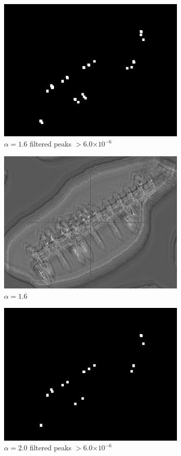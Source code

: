 \documentclass[12pt]{article}
\providecommand{\e}[1]{\ensuremath{\times 10^{#1}}}
\begin{document}
\begin{figure}
\centering
\includegraphics[width=0.80\textwidth]{v2/boats_a16_peak.png}
\caption{\(\alpha=1.6\) filtered peaks \(> 6.0\e{-6}\)}
\label{a16peak}
\end{figure}

\begin{figure}
\centering
\includegraphics[width=0.80\textwidth]{v2/boats_a16.png}
\caption{\(\alpha=1.6\)}
\label{a16}
\end{figure}

\begin{figure}
\centering
\includegraphics[width=0.80\textwidth]{v2/boats_a20_peak.png}
\caption{\(\alpha=2.0\) filtered peaks \(> 6.0\e{-6}\)}
\label{a20peak}
\end{figure}
\end{document}
